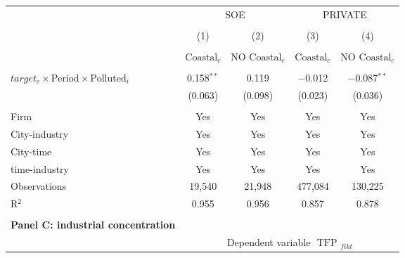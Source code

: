\documentclass[12pt]{article}
\begin{document}
\begin{table}[!htb]
\begin{adjustbox}{width=\textwidth, totalheight=\baselineskip,keepaspectratio}
\begin{tabular}{@{\extracolsep{5pt}}lcccc}
\\[-1.8ex]
            &\multicolumn{2}{c}{SOE}&\multicolumn{2}{c}{PRIVATE}\\
\\[-1.8ex] & (1) & (2) & (3) & (4)\\
 \\[-1.8ex]&  $\text{Coastal}_c$  & $\text{NO  Coastal}_c$  &  $\text{Coastal}_c$  & $\text{NO  Coastal}_c$ \\
 \hline \\[-1.8ex] 
   $target_c \times \text{Period} \times \text{Polluted}_i$  & 0.158$^{**}$ & 0.119 & $-$0.012 & $-$0.087$^{**}$ \\ 
  & (0.063) & (0.098) & (0.023) & (0.036) \\ 
 \hline \\[-1.8ex] 
Firm & Yes & Yes & Yes & Yes \\ 
City-industry & Yes & Yes & Yes & Yes \\ 
City-time & Yes & Yes & Yes & Yes \\ 
time-industry & Yes & Yes & Yes & Yes \\ 
Observations & 19,540 & 21,948 & 477,084 & 130,225 \\ 
R$^{2}$ & 0.955 & 0.956 & 0.857 & 0.878 \\ 

\bottomrule 
\\ %
        \multicolumn{1}{l}{\textbf{Panel C: industrial concentration}} \\
        \toprule
         & \multicolumn{4}{c}{Dependent variable $\text { TFP }_{fikt}$} \\ 
\cline{2-5}
            

\end{tabular}
\end{adjustbox}
\end{table}
\end{document}
